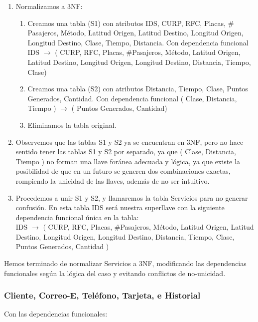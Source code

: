 \documentclass{article}
\begin{document}
\begin{enumerate}
         \item Normalizamos a 3NF:
         \begin{enumerate}
         \item Creamos una tabla (S1) con atributos IDS, CURP, RFC, Placas, $\#$Pasajeros, Método,
           Latitud Origen, Latitud Destino, Longitud Origen, Longitud Destino, Clase, Tiempo,
           Distancia. Con dependencia funcional IDS $\rightarrow$ ( CURP, RFC, Placas, $\#$Pasajeros,
           Método, Latitud Origen, Latitud Destino, Longitud Origen, Longitud Destino, Distancia,
           Tiempo, Clase)
         \item Creamos una tabla (S2) con atributos Distancia, Tiempo, Clase, Puntos Generados,
           Cantidad. Con dependencia funcional ( Clase, Distancia, Tiempo ) $\rightarrow$ (
           Puntos Generados, Cantidad)
         \item Eliminamos la tabla original.
         \end{enumerate}
       \item Observemos que las tablas S1 y S2 ya se encuentran en 3NF, pero no hace sentido tener
         las tablas S1 y S2 por separado, ya que ( Clase, Distancia, Tiempo ) no forman una llave
         foránea adecuada y lógica, ya que existe la posibilidad de que en un futuro se generen dos
         combinaciones exactas, rompiendo la unicidad de las llaves, además de no ser intuitivo.
       \item Procedemos a unir S1 y S2, y llamaremos la tabla Servicios para no generar confusión.
         En esta tabla IDS será nuestra superllave con la siguiente dependencia funcional única en
         la tabla: \\

         IDS $\rightarrow$ ( CURP, RFC, Placas, $\#$Pasajeros,
           Método, Latitud Origen, Latitud Destino, Longitud Origen, Longitud Destino, Distancia,
           Tiempo, Clase, Puntos Generados, Cantidad )

       \end{enumerate}
           
       Hemos terminado de normalizar Servicios a 3NF, modificando las dependencias funcionales según
       la lógica del caso y evitando conflictos de no-unicidad.
       
      \subsubsection{Cliente, Correo-E, Teléfono, Tarjeta, e Historial}
      Con las dependencias funcionales:
      
\end{document}
